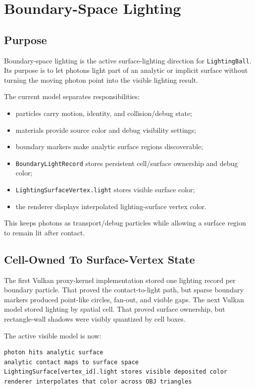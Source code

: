 \newpage
\section{Boundary-Space Lighting}

\subsection{Purpose}

Boundary-space lighting is the active surface-lighting direction for
\texttt{LightingBall}.  Its purpose is to let photons light part of an
analytic or implicit surface without turning the moving photon point into the
visible lighting result.

The current model separates responsibilities:
\begin{itemize}
    \item particles carry motion, identity, and collision/debug state;
    \item materials provide source color and debug visibility settings;
    \item boundary markers make analytic surface regions discoverable;
    \item \texttt{BoundaryLightRecord} stores persistent cell/surface
          ownership and debug color;
    \item \texttt{LightingSurfaceVertex.light} stores visible surface color;
    \item the renderer displays interpolated lighting-surface vertex color.
\end{itemize}

This keeps photons as transport/debug particles while allowing a surface region
to remain lit after contact.

\subsection{Cell-Owned To Surface-Vertex State}

The first Vulkan proxy-kernel implementation stored one lighting record per
boundary particle.  That proved the contact-to-light path, but sparse boundary
markers produced point-like circles, fan-out, and visible gaps.  The next
Vulkan model stored lighting by spatial cell.  That proved surface ownership,
but rectangle-wall shadows were visibly quantized by cell boxes.

The active visible model is now:
\begin{verbatim}
photon hits analytic surface
analytic contact maps to surface space
LightingSurface[vertex_id].light stores visible deposited color
renderer interpolates that color across OBJ triangles
\end{verbatim}

